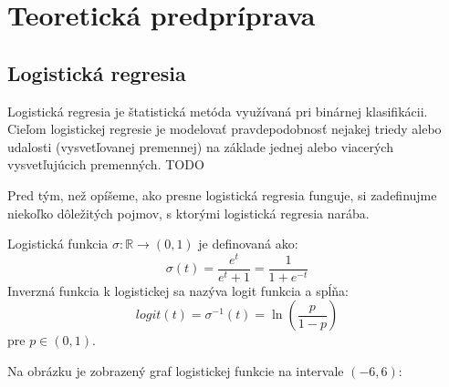\section{Teoretická predpríprava}
\label{teoreticka predpriprava}

\subsection{Logistická regresia}
 
Logistická regresia je štatistická metóda využívaná pri binárnej klasifikácii.
Cieľom logistickej regresie je modelovať pravdepodobnosť nejakej triedy alebo udalosti (vysvetľovanej premennej)
na základe jednej alebo viacerých vysvetľujúcich premenných. TODO

Pred tým, než opíšeme, ako presne logistická regresia funguje, si zadefinujme niekoľko dôležitých pojmov, s ktorými logistická regresia narába.

\begin{defin}
    Logistická funkcia \( \sigma : \mathbb{R} \rightarrow (0, 1) \) je definovaná ako:
    \[
        \sigma(t) = \frac{e^t}{e^t + 1} = \frac{1}{1 + e^{-t}}
    \]
    Inverzná funkcia k logistickej sa nazýva logit funkcia a spĺňa:
    \[
        logit(t) = \sigma^{-1}(t) = \ln\left(\frac{p}{1 - p}\right)
    \]
    pre \( p \in (0, 1) \).
\end{defin}

Na obrázku je zobrazený graf logistickej funkcie na intervale \( (-6, 6) \):

    
        


